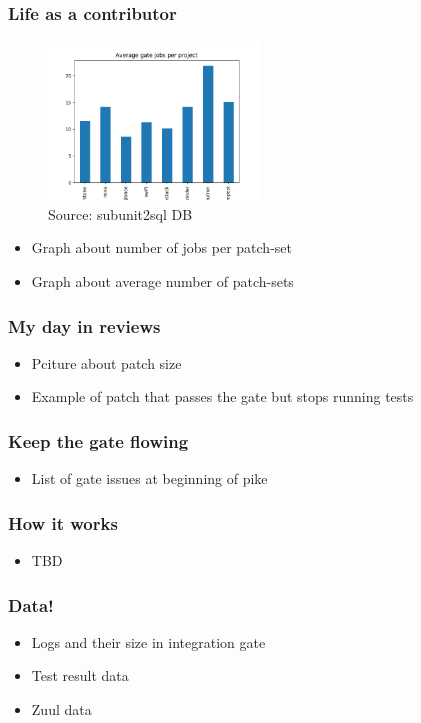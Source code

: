 \documentclass[aspectratio=169,11pt,hyperref={colorlinks=true}]{beamer}
\begin{document}
\begin{frame}
    \frametitle{Life as a contributor}
    \begin{figure}
    \begin{center}
    	\includegraphics[width=0.5\textwidth]{gate_jobs.png}
         \caption{Source: subunit2sql DB}
    \end{center}
    \end{figure}
    \begin{itemize}
        \item{Graph about number of jobs per patch-set}
        \item{Graph about average number of patch-sets}
    \end{itemize}
\end{frame}

\begin{frame}
    \frametitle{My day in reviews}
    \begin{itemize}
        \item{Pciture about patch size}
        \item{Example of patch that passes the gate but stops running tests}
    \end{itemize}
\end{frame}

\begin{frame}
    \frametitle{Keep the gate flowing}
    \begin{itemize}
        \item{List of gate issues at beginning of pike}
    \end{itemize}
\end{frame}

\begin{frame}
    \frametitle{How it works}
    \begin{itemize}
        \item{TBD}
    \end{itemize}
\end{frame}

\begin{frame}
    \frametitle{Data!}
    \begin{itemize}
        \item{Logs and their size in integration gate}
        \item{Test result data}
        \item{Zuul data}
    \end{itemize}
\end{frame}
\end{document}
